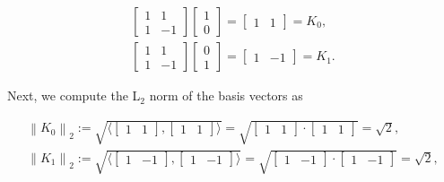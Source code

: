 \begin{equation}
  \begin{array}{l}
    \begin{bmatrix}
      1 & 1 \\
      1 & -1
    \end{bmatrix}
    \begin{bmatrix}
      1 \\
      0
    \end{bmatrix}
    =
    \begin{bmatrix}
      1 & 1
    \end{bmatrix} = K_0,
    \\
    \begin{bmatrix}
      1 & 1 \\
      1 & -1
    \end{bmatrix}
    \begin{bmatrix}
      0 \\
      1
    \end{bmatrix}
    =
    \begin{bmatrix}
      1 & -1
    \end{bmatrix} = K_1.
  \end{array}
\end{equation}

Next, we compute the L$_2$ norm of the basis vectors as

\begin{equation}
  \begin{array}{l}
    \left\| K_0 \right\|_2 := \sqrt{\langle \begin{bmatrix}1 & 1\end{bmatrix}, \begin{bmatrix}1 & 1\end{bmatrix} \rangle} = \sqrt{\begin{bmatrix}1 & 1\end{bmatrix}\cdot \begin{bmatrix}1 & 1\end{bmatrix}} = \sqrt{2},\\
    \left\| K_1 \right\|_2 := \sqrt{\langle \begin{bmatrix}1 & -1\end{bmatrix}, \begin{bmatrix}1 & -1\end{bmatrix} \rangle} = \sqrt{\begin{bmatrix}1 & -1\end{bmatrix}\cdot \begin{bmatrix}1 & -1\end{bmatrix}} = \sqrt{2},
  \end{array}
\end{equation}

